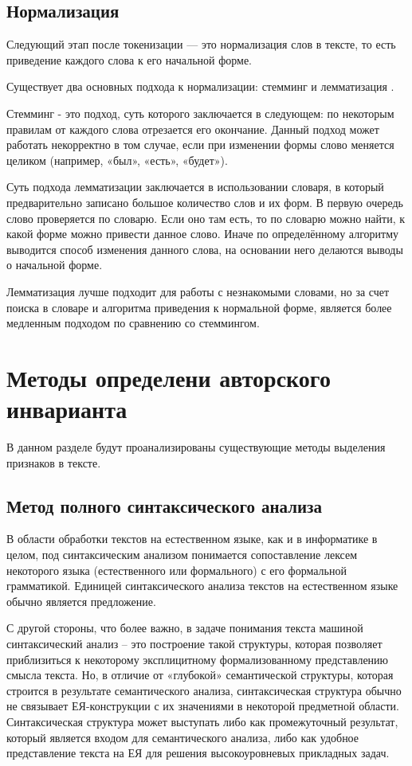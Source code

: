 \subsection{Нормализация}

Следующий этап после токенизации — это нормализация слов в тексте, то есть приведение каждого слова к его начальной форме. 

Существует два основных подхода к нормализации: стемминг и лемматизация  \cite{tutorial}.

Стемминг - это подход, суть которого заключается в следующем: по некоторым правилам от каждого слова отрезается его окончание. Данный подход может работать некорректно в том случае, если при изменении формы слово меняется целиком (например, «был», «есть», «будет»).

Суть подхода лемматизации заключается в  использовании словаря, в который предварительно записано большое количество слов и их форм. В первую очередь слово проверяется по словарю. Если оно там есть, то по словарю можно найти, к какой форме можно привести данное слово. Иначе по определённому алгоритму выводится способ изменения данного слова, на основании него делаются выводы о начальной форме.

Лемматизация лучше подходит для работы с незнакомыми словами, но за счет поиска в словаре и алгоритма приведения к нормальной форме, является более медленным подходом по сравнению со стеммингом.


\section{Методы определени авторского инварианта}

В данном разделе будут проанализированы существующие методы выделения признаков в тексте.

\subsection{Метод полного синтаксического анализа}

В области обработки текстов на естественном языке, как и в информатике в целом, под синтаксическим анализом понимается сопоставление лексем некоторого языка (естественного или формального) с его формальной грамматикой. Единицей синтаксического анализа текстов на естественном языке обычно является предложение.

С другой стороны, что более важно, в задаче понимания текста машиной синтаксический анализ – это построение такой структуры, которая позволяет приблизиться к некоторому эксплицитному формализованному представлению смысла текста. Но, в отличие от «глубокой» семантической структуры, которая строится в результате семантического анализа, синтаксическая структура обычно не связывает ЕЯ-конструкции с их значениями в некоторой предметной области. Синтаксическая структура может выступать либо как промежуточный результат, который является входом для семантического анализа, либо как удобное представление текста на ЕЯ для решения высокоуровневых прикладных задач.

